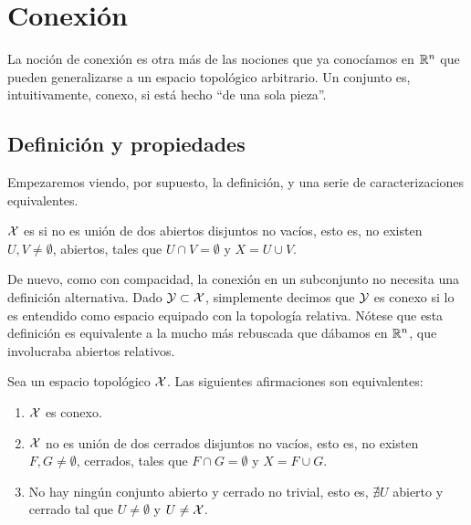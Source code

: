 \chapter{Conexión}
\label{conex}

La noción de conexión es otra más de las nociones que ya conocíamos en $\mathbb{R}^n$ que pueden generalizarse a un espacio topológico arbitrario. Un conjunto es, intuitivamente, conexo, si está hecho ``de una sola pieza''. 

\section{Definición y propiedades}

Empezaremos viendo, por supuesto, la definición, y una serie de caracterizaciones equivalentes.

\begin{defi}[Conexión]
	$\mathcal{X}$ es   si no es unión de dos abiertos disjuntos no vacíos, esto es, no existen $U,V\neq\emptyset$, abiertos, tales que $U\cap V=\emptyset$ y $X=U\cup V$.
\end{defi}

\begin{obs}
	De nuevo, como con compacidad, la conexión en un subconjunto no necesita una definición alternativa. Dado $\mathcal{Y}\subset\mathcal{X}$, simplemente decimos que $\mathcal{Y}$ es conexo si lo es entendido como espacio equipado con la topología relativa. Nótese que esta definición es equivalente a la mucho más rebuscada que dábamos en $\mathbb{R}^n$, que involucraba abiertos relativos.
\end{obs}

\begin{prop}
	Sea un espacio topológico $\mathcal{X}$. Las siguientes afirmaciones son equivalentes:
	\begin{enumerate}
		\item $\mathcal{X}$ es conexo.
		\item $\mathcal{X}$ no es unión de dos cerrados disjuntos no vacíos, esto es, no existen $F,G\neq\emptyset$, cerrados, tales que $F\cap G=\emptyset$ y $X=F\cup G$.
		\item No hay ningún conjunto abierto y cerrado no trivial, esto es, $\nexists U$ abierto y cerrado tal que $U\neq\emptyset$ y $U\neq\mathcal{X}$.
	\end{enumerate}
\end{prop}


